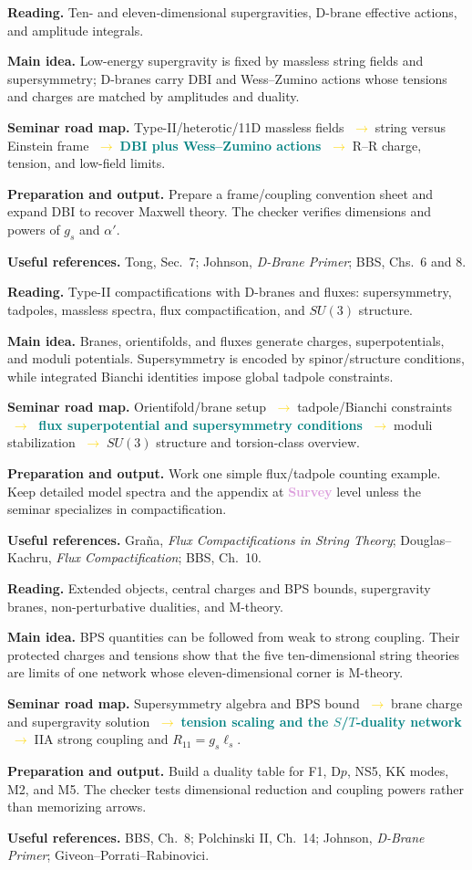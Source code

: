 \documentclass[11pt]{article}
\newcommand{\survey}{\textcolor{plum}{\textbf{Survey}}}
\newcommand{\essential}[1]{\textcolor{teal}{\textbf{#1}}}
\newcommand{\roadarrow}{\textcolor{gold}{\ensuremath{\;\longrightarrow\;}}}
\newcommand{\seminarweek}[7]{%
  \begin{tcolorbox}[
    enhanced,
    colback=white,colframe=navy,
    boxrule=0.65pt,arc=1.5mm,
    left=3mm,right=3mm,top=2mm,bottom=2mm,
    title={#1\hfill\normalfont #2},
    fonttitle=\bfseries,coltitle=white,colbacktitle=navy
  ]
  \textbf{Reading.} #3

  \textbf{Main idea.} #4

  \textbf{Seminar road map.} #5

  \textbf{Preparation and output.} #6

  \textbf{Useful references.} #7
  \end{tcolorbox}
}
\begin{document}
\seminarweek{Week 25}{Ch.~16.4--16.6, pp.~622--640}
{Ten- and eleven-dimensional supergravities, D-brane effective actions, and
amplitude integrals.}
{Low-energy supergravity is fixed by massless string fields and supersymmetry;
D-branes carry DBI and Wess--Zumino actions whose tensions and charges are
matched by amplitudes and duality.}
{Type-II/heterotic/11D massless fields \roadarrow string versus Einstein frame
\roadarrow \essential{DBI plus Wess--Zumino actions} \roadarrow R--R charge,
tension, and low-field limits.}
{Prepare a frame/coupling convention sheet and expand DBI to recover Maxwell
theory.  The checker verifies dimensions and powers of $g_s$ and $\alpha'$.}
{Tong, Sec.~7; Johnson, \emph{D-Brane Primer}; BBS, Chs.~6 and 8.}

\seminarweek{Week 26}{Ch.~17, pp.~641--674}
{Type-II compactifications with D-branes and fluxes: supersymmetry, tadpoles,
massless spectra, flux compactification, and $SU(3)$ structure.}
{Branes, orientifolds, and fluxes generate charges, superpotentials, and moduli
potentials.  Supersymmetry is encoded by spinor/structure conditions, while
integrated Bianchi identities impose global tadpole constraints.}
{Orientifold/brane setup \roadarrow tadpole/Bianchi constraints \roadarrow
\essential{flux superpotential and supersymmetry conditions} \roadarrow moduli
stabilization \roadarrow $SU(3)$ structure and torsion-class overview.}
{Work one simple flux/tadpole counting example.  Keep detailed model spectra and
the appendix at \survey{} level unless the seminar specializes in
compactification.}
{Gra\~na, \emph{Flux Compactifications in String Theory};
Douglas--Kachru, \emph{Flux Compactification}; BBS, Ch.~10.}

\seminarweek{Week 27}{Ch.~18.1--18.7, pp.~675--723}
{Extended objects, central charges and BPS bounds, supergravity branes,
non-perturbative dualities, and M-theory.}
{BPS quantities can be followed from weak to strong coupling.  Their protected
charges and tensions show that the five ten-dimensional string theories are
limits of one network whose eleven-dimensional corner is M-theory.}
{Supersymmetry algebra and BPS bound \roadarrow brane charge and supergravity
solution \roadarrow \essential{tension scaling and the $S$/$T$-duality network}
\roadarrow IIA strong coupling and $R_{11}=g_s\ell_s$.}
{Build a duality table for F1, D$p$, NS5, KK modes, M2, and M5.  The checker
tests dimensional reduction and coupling powers rather than memorizing arrows.}
{BBS, Ch.~8; Polchinski II, Ch.~14; Johnson, \emph{D-Brane Primer};
Giveon--Porrati--Rabinovici.}
\end{document}
